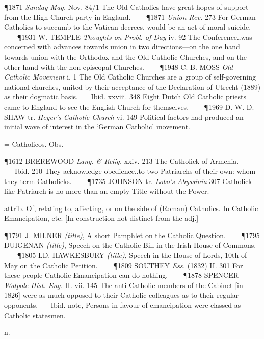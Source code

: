 \begin{description}[wide, labelwidth=!, labelindent=0pt]
\begin{myenumerate}
\P 1871 \textit{Sunday  Mag.} Nov. 84/1 The Old Catholics have great hopes of support from the High Church party in England.    
\P 1871 \textit{Union  Rev.} 273 For German Catholics to succumb to the Vatican decrees, would be an act of moral suicide.    
\P 1931 W. TEMPLE  \textit{Thoughts on Probl. of Day} iv. 92 The Conference‥was concerned with advances towards union in two directions—on the one hand towards union with the Orthodox and the Old Catholic Churches, and on the other hand with the non-episcopal Churches.    
\P 1948 C. B. MOSS  \textit{Old Catholic Movement} i. 1 The Old Catholic Churches are a group of self-governing national churches, united by their acceptance of the Declaration of Utrecht (1889) as their dogmatic basis.    Ibid. xxviii. 348 Eight Dutch Old Catholic priests came to England to see the English Church for themselves.    
\P 1969 D. W. D.  SHAW tr. \textit{Heyer's Catholic Church} vi. 149 Political factors had produced an initial wave of interest in the ‘German Catholic’ movement.

 = Catholicos. Obs.

\P 1612 BREREWOOD  \textit{Lang. \& Relig.} xxiv. 213 The Catholick of Armenia.    Ibid. 210 They acknowledge obedience‥to two Patriarchs of their own: whom they term Catholicks.    
\P 1735 JOHNSON tr. \textit{Lobo's Abyssinia} 307 Catholick like Patriarch is no more than an empty Title without the Power.

 attrib. Of, relating to, affecting, or on the side of (Roman) Catholics. In Catholic Emancipation, etc. [In construction not distinct from the adj.]

\P 1791 J. MILNER  \textit{(title)}, A short Pamphlet on the Catholic Question.    
\P 1795 DUIGENAN  \textit{(title)}, Speech on the Catholic Bill in the Irish House of Commons.    
\P 1805 LD. HAWKESBURY  \textit{(title)}, Speech in the House of Lords, 10th of May on the Catholic Petition.    
\P 1809 SOUTHEY  \textit{Ess.} (1832) II. 301 For these people Catholic Emancipation can do nothing.    
\P 1878 SPENCER  \textit{Walpole Hist. Eng.} II. vii. 145 The anti-Catholic members of the Cabinet [in 1826] were as much opposed to their Catholic colleagues as to their regular opponents.    Ibid. note, Persons in favour of emancipation were classed as Catholic statesmen.
\end{myenumerate}


 n.

\noindent {}


\end{description}
